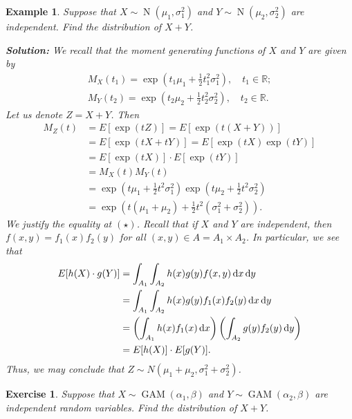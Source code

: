 \documentclass[10pt]{article}
\newcommand{\R}{\mathbb{R}}
\DeclareMathOperator{\Nor}{N}
\DeclareMathOperator{\GAM}{GAM}
\theoremstyle{newstyle}
\newtheorem{exercise}[thm]{Exercise}
\newtheorem{exmp}[thm]{Example}
\begin{document}
\begin{exmp}
Suppose that $X \sim \Nor(\mu_1, \sigma_1^2)$ and $Y \sim \Nor(\mu_2, \sigma_2^2)$ are 
independent. Find the distribution of $X+Y$.

{\color{blue}
    {\bf Solution:} We recall that the moment generating functions of $X$ and $Y$ are given by 
    \begin{align*}
        M_X(t_1) = \exp(t_1 \mu_1 + \tfrac12 t_1^2 \sigma_1^2), \quad t_1 \in \R; \\
        M_Y(t_2) = \exp(t_2 \mu_2 + \tfrac12 t_2^2 \sigma_2^2), \quad t_2 \in \R.
    \end{align*}
    Let us denote $Z = X+Y$. Then 
    \begin{align*}
        M_Z(t) &= E[\exp(tZ)] = E[\exp(t(X+Y))] \\
        &= E[\exp(tX + tY)] = E[\exp(tX) \exp(tY)] \\
        &= E[\exp(tX)] \cdot E[\exp(tY)] \tag{$\star$} \\
        &= M_X(t) M_Y(t) \\ 
        &= \exp(t\mu_1 + \tfrac12 t^2 \sigma_1^2) \exp(t\mu_2 + \tfrac12 t^2 \sigma_2^2) \\
        &= \exp(t(\mu_1+\mu_2) + \tfrac12t^2 (\sigma_1^2 + \sigma_2^2)). 
    \end{align*}
    We justify the equality at $(\star)$. Recall that if $X$ and $Y$ are independent, then 
    $f(x, y) = f_1(x) f_2(y)$ for all $(x, y) \in A= A_1 \times A_2$. In particular, we see that 
    \begin{align*}
        E[h(X) \cdot g(Y)] &= \int_{A_1} \int_{A_2} h(x) g(y) f(x, y)\,{\rm d}x\,{\rm d}y \\
        &= \int_{A_1} \int_{A_2} h(x) g(y) f_1(x) f_2(y)\,{\rm d}x\,{\rm d}y \\
        &= \left( \int_{A_1} h(x) f_1(x) \,{\rm d}x \right) \left( \int_{A_2} g(y) f_2(y)\,{\rm d}y 
        \right) \\
        &= E[h(X)] \cdot E[g(Y)].
    \end{align*}
    Thus, we may conclude that $Z \sim N(\mu_1 + \mu_2, \sigma_1^2 + \sigma_2^2)$. 
    }
\end{exmp}

\begin{exercise}
Suppose that $X \sim \GAM(\alpha_1, \beta)$ and $Y \sim \GAM(\alpha_2, \beta)$ are independent 
random variables. Find the distribution of $X+Y$.
\end{exercise}
\end{document}
